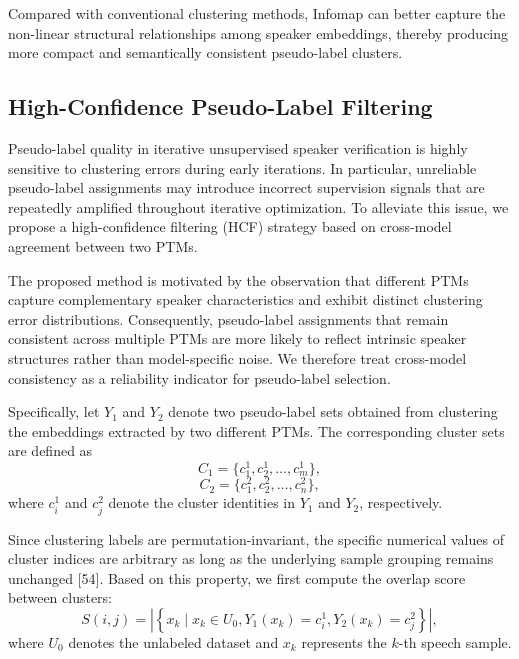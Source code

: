 \documentclass[lettersize,journal]{IEEEtran}
\begin{document}
Compared with conventional clustering methods, Infomap can better capture the non-linear structural relationships among speaker embeddings, thereby producing more compact and semantically consistent pseudo-label clusters.

\subsection{High-Confidence Pseudo-Label Filtering}

Pseudo-label quality in iterative unsupervised speaker verification is highly sensitive to clustering errors during early iterations. In particular, unreliable pseudo-label assignments may introduce incorrect supervision signals that are repeatedly amplified throughout iterative optimization. To alleviate this issue, we propose a high-confidence filtering (HCF) strategy based on cross-model agreement between two PTMs.

The proposed method is motivated by the observation that different PTMs capture complementary speaker characteristics and exhibit distinct clustering error distributions. Consequently, pseudo-label assignments that remain consistent across multiple PTMs are more likely to reflect intrinsic speaker structures rather than model-specific noise. We therefore treat cross-model consistency as a reliability indicator for pseudo-label selection.

Specifically, let $Y_1$ and $Y_2$ denote two pseudo-label sets obtained from clustering the embeddings extracted by two different PTMs. The corresponding cluster sets are defined as
\begin{equation}
C_1=\{c_1^1,c_2^1,\ldots,c_m^1\},
\end{equation}
\begin{equation}
C_2=\{c_1^2,c_2^2,\ldots,c_n^2\},
\end{equation}
where $c_i^1$ and $c_j^2$ denote the cluster identities in $Y_1$ and $Y_2$, respectively.

Since clustering labels are permutation-invariant, the specific numerical values of cluster indices are arbitrary as long as the underlying sample grouping remains unchanged [54]. Based on this property, we first compute the overlap score between clusters:
\begin{equation}
S(i,j)
=
\left|
\left\{
x_k
\mid
x_k\in U_0,
Y_1(x_k)=c_i^1,
Y_2(x_k)=c_j^2
\right\}
\right|,
\end{equation}
where $U_0$ denotes the unlabeled dataset and $x_k$ represents the $k$-th speech sample.
\end{document}
